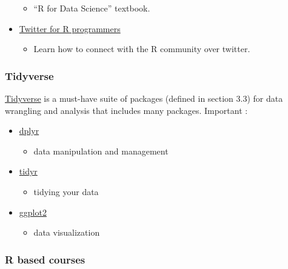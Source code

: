 \documentclass[
]{book}
\providecommand{\tightlist}{%
  \setlength{\itemsep}{0pt}\setlength{\parskip}{0pt}}
\begin{document}
\begin{itemize}
  \begin{itemize}
  \tightlist
  \item
    ``R for Data Science'' textbook.
  \end{itemize}
\item
  \href{https://www.t4rstats.com/}{Twitter for R programmers}

  \begin{itemize}
  \tightlist
  \item
    Learn how to connect with the R community over twitter.
  \end{itemize}
\end{itemize}

\hypertarget{tidyverse}{%
\subsubsection*{Tidyverse}\label{tidyverse}}

\href{https://www.tidyverse.org/}{Tidyverse} is a must-have suite of packages (defined in section 3.3) for data wrangling and analysis that includes many packages. Important :

\begin{itemize}
\item
  \href{https://dplyr.tidyverse.org/}{dplyr}

  \begin{itemize}
  \tightlist
  \item
    data manipulation and management
  \end{itemize}
\item
  \href{https://tidyr.tidyverse.org/}{tidyr}

  \begin{itemize}
  \tightlist
  \item
    tidying your data
  \end{itemize}
\item
  \href{https://ggplot2.tidyverse.org/}{ggplot2}

  \begin{itemize}
  \tightlist
  \item
    data visualization
  \end{itemize}
\end{itemize}

\hypertarget{r-based-courses}{%
\subsubsection*{R based courses}\label{r-based-courses}}
\end{document}
